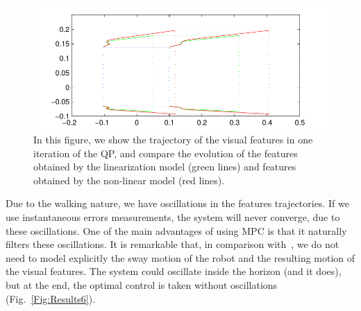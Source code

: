 \begin{figure}[ht]
 \centering
 \includegraphics[scale=.6]{figures/comparison_linearization.pdf}
 \caption{\label{Fig:Results5}\small{In this figure, we show the trajectory of the visual features in one iteration of the QP, and compare the evolution of the features obtained by the linearization model (green lines) and features obtained by the non-linear model (red lines).}}
 \end{figure}

Due to the walking nature, we have oscillations in the features trajectories. If we use instantaneous errors measurements, the system will never converge, due to these oscillations. One of the main advantages of using MPC is that it naturally filters these oscillations. It is remarkable that, in comparison with~\cite{DuneIROS2010}, we do not need to model explicitly the sway motion of the robot and the resulting motion of the visual features. The system could oscillate inside the horizon (and it does), but at the end, the optimal control is taken without oscillations (Fig.~\ref{Fig:Results6}).

